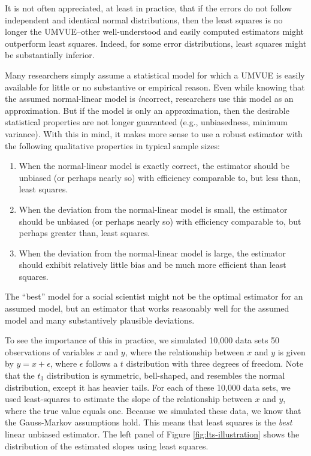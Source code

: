 \documentclass[12pt]{article}
\begin{document}
It is not often appreciated, at least in practice, that if the errors do not follow independent and identical normal distributions, then the least squares is no longer the UMVUE--other well-understood and easily computed estimators might outperform least squares. 
Indeed, for some error distributions, least squares might be substantially inferior.

Many researchers simply assume a statistical model for which a UMVUE is easily available for little or no substantive or empirical reason. 
Even while knowing that the assumed normal-linear model is \textit{in}correct, researchers use this model as an approximation. But if the model is only an approximation, then the desirable statistical properties are not longer guaranteed (e.g., unbiasedness, minimum variance). 
With this in mind, it makes more sense to use a robust estimator with the following qualitative properties in typical sample sizes:
\begin{enumerate}
\item When the normal-linear model is exactly correct, the estimator should be unbiased (or perhaps nearly so) with efficiency comparable to, but less than, least squares.
\item When the deviation from the normal-linear model is small, the estimator should be unbiased  (or perhaps nearly so) with efficiency comparable to, but perhaps greater than, least squares.
\item When the deviation from the normal-linear model is large, the estimator should exhibit relatively little bias and be much more efficient than least squares.
\end{enumerate}
\noindent The ``best'' model for a social scientist might not be the optimal estimator for an assumed model, but an estimator that works reasonably well for the assumed model and many substantively plausible deviations. 

To see the importance of this in practice, we simulated 10,000 data sets 50 observations of variables $x$ and $y$, where the relationship between $x$ and $y$ is given by $y = x + \epsilon$, where $\epsilon$ follows a $t$ distribution with three degrees of freedom. 
Note that the $t_3$ distribution is symmetric, bell-shaped, and resembles the normal distribution, except it has heavier tails. 
For each of these 10,000 data sets, we used least-squares to estimate the slope of the relationship between $x$ and $y$, where the true value equals one. 
Because we simulated these data, we know that the Gauss-Markov assumptions hold. 
This means that least squares is the \textit{best} linear unbiased estimator. 
The left panel of Figure \ref{fig:lts-illustration} shows the distribution of the estimated slopes using least squares.
\end{document}
